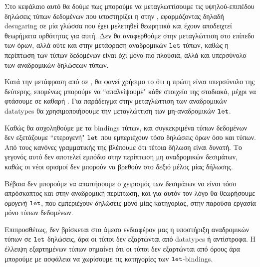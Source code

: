 Στο κεφάλαιο αυτό θα δούμε πως μπορούμε να μεταγλωττίσουμε τις υψηλού-επιπέδου
δηλώσεις τύπων δεδομένων που υποστηρίζει η \FIR{} στην \FOMF, εφαρμόζοντας δηλαδή
desugaring σε μία γλώσσα που έχει μελετηθεί θεωρητικά και έχουν αποδειχτεί θεωρήματα
ορθότητας για αυτή. Δεν θα αναφερθούμε στην μεταγλώττιση στο επίπεδο των όρων, αλλά
ούτε και στην μετάφραση αναδρομικών $\operatorname{\texttt{let}}$ τύπων, καθώς η περίπτωση των τύπων δεδομένων
είναι όχι μόνο πιο πλούσια, αλλά και υπερσύνολο των αναδρομικών δηλώσεων τύπων.

Κατά την μετάφραση από \FIR{} σε \FOMF{}, θα φανεί χρήσιμο το ότι η πρώτη είναι υπερσύνολο
της δεύτερης, επομένως μπορούμε να ``απαλείψουμε" κάθε στοιχείο της \FIR{} σταδιακά, μέχρι
να φτάσουμε σε καθαρή \FOMF{}. Για παράδειγμα στην μεταγλώττιση των αναδρομικών datatypes
θα χρησιμοποιήσουμε την μεταγλώττιση των μη-αναδρομικών $\operatorname{\texttt{let}}$.

Καθώς θα ασχοληθούμε με τα bindings τύπων, και συγκεκριμένα τύπων δεδομένων δεν εξετάζουμε
``ετερογενή" $\operatorname{\texttt{let}}$ που εμπεριέχουν τόσο δηλώσεις όρων όσο και τύπων. Από τους κανόνες
γραμματικής της \FIR{} βλέπουμε ότι τέτοια δήλωση είναι δυνατή. Το γεγονός αυτό δεν αποτελεί
εμπόδιο στην περίπτωση μη αναδρομικών δεσιμάτων, καθώς οι νέοι ορισμοί δεν μπορούν να βρεθούν
στο δεξιό μέλος μίας δήλωσης.

Βέβαια δεν μπορούμε να απαιτήσουμε ο χειρισμός των δεσιμάτων να είναι τόσο απρόσκοπτος και στην
αναδρομική περίπτωση, και για αυτόν τον λόγο θα θεωρήσουμε \emph{ομογενή} $\operatorname{\texttt{let}}$, που εμπεριέχουν
δηλώσεις μόνο μίας κατηγορίας, στην παρούσα εργασία μόνο τύπων δεδομένων.

Επιπροσθέτως, δεν βρίσκεται στο άμεσο ενδιαφέρον μας η υποστήριξη αναδρομικών τύπων σε $\operatorname{\texttt{let}}$
δηλώσεις, άρα οι τύποι δεν εξαρτώνται από datatypes ή αντίστροφα. Η έλλειψη εξαρτημένων τύπων
σημαίνει ότι οι τύποι δεν εξαρτώνται από όρους άρα μπορούμε με ασφάλεια να χωρίσουμε τις κατηγορίες
των $\operatorname{\texttt{let}}$-bindings.
